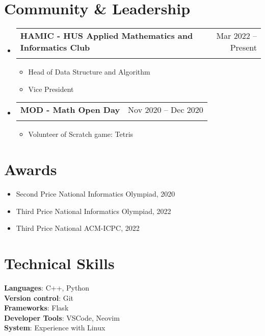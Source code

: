 \documentclass[letterpaper,11pt]{article}
\makeatletter
\newcommand{\resumeItem}[1]{
  \item\small{
    {#1 \vspace{-2pt}}
  }
}
\newcommand{\resumeSubheading}[4]{
  \vspace{-2pt}\item
    \begin{tabular*}{0.97\textwidth}[t]{l@{\extracolsep{\fill}}r}
      \textbf{#1} & #2 \\
      \textit{\small#3} & \textit{\small #4} \\
    \end{tabular*}\vspace{-7pt}
}
\newcommand{\resumeSubHeadingListStart}{\begin{itemize}[leftmargin=0.15in, label={}]}
\newcommand{\resumeSubHeadingListEnd}{\end{itemize}}
\newcommand{\resumeItemListStart}{\begin{itemize}}
\newcommand{\resumeItemListEnd}{\end{itemize}\vspace{-5pt}}
\makeatother
\begin{document}
\section{Community \& Leadership}
  \resumeSubHeadingListStart

    \resumeSubheading
      {HAMIC - HUS Applied Mathematics and Informatics Club}{Mar 2022 – Present}
      {}{}
      \resumeItemListStart
        \resumeItem{Head of Data Structure and Algorithm}
        \resumeItem{Vice President}
      \resumeItemListEnd
      
    \resumeSubheading
      {MOD - Math Open Day}{Nov 2020 – Dec 2020}
      {}{}
      \resumeItemListStart
        \resumeItem{Volunteer of Scratch game: Tetris}
      \resumeItemListEnd

    \resumeSubHeadingListEnd

\section{Awards}

    \begin{itemize}
        \item Second Price National Informatics Olympiad, 2020
        \item Third Price National Informatics Olympiad, 2022
        \item Third Price National ACM-ICPC, 2022
    \end{itemize}


%
\section{Technical Skills}
 \begin{itemize}[leftmargin=0.15in, label={}]
    \small{\item{
     \textbf{Languages}{: C++, Python} \\
     \textbf{Version control}{: Git} \\
     \textbf{Frameworks}{: Flask} \\
     \textbf{Developer Tools}{: VSCode, Neovim} \\
     \textbf{System}{: Experience with Linux} \\
    }}
 \end{itemize}


\end{document}
